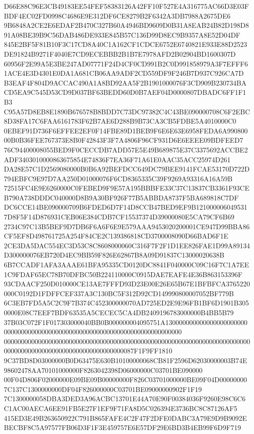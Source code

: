 \documentclass[UTF8,fontset=fandol,zihao=-4,a4paper]{ctexart}
\begin{document}
{{D66E88C96E3CB49183EE54FEF58383126A42FF10F527E4A316775AC66D3E03FBDF4EC02FD0998C4686E9E312DF6CE8279B2F6342A3DB7988A2675DE6
9B6848A2CE2E6EDAF2B470C327B60A4946BD9609D0B31A8EAB24B82D198D891A08BE39B9C56DAB486DE933E845B57C136D99D8EC9B9357A8E52D04DF
845E2BF5F81B10F3C17CD8A40C1A162CF1CDCE6752E6740821E933E88D2523DE91824B9271F4040E7CD9ECEBBB2B1B7E7978AFD2B02904BD1600307D
60956F2E99A5E3BE247AD07771F24D4CF0CD991B2C0D991858979A3F7EFFF61ACE4E3D4301E0DA1A681CB06AA9ADF2CD559DF9F246B7D937C926CA7D
B3EAF4F804D9ACCAC490A1A8BD92AA5F2B1901000076F3CD909B230734BACD5EA9C545D53CD9D037BF63BEDD60D0B7AEF04D0000807DBADC6FF1F1B3
C95A57D8EB8E1890B676578B8BDD7C73DC97382C4C43BE090000708C6F2EBC8D38FA17C6FAA6161783F62B7AE6D288B9B73CA3CB5FDBE5A4010000C0
0EBEF91D736F6EFFEE2EF0F14FBE89D1BEB9F6E6E63E6958FEDA6A99080000B0B36FEE767373E8B0F42843F3F7A4806F96CF931D6E6EEEE09BDFEED7
76C94400008055BED9F0CECCDB7ADD57E5E49B689875E37C3375692ACCBE2ADF3403010000863675854E74836F7EA36F71A61E0AAC35ACC25974D261
DA28E57C1D2569080000B0B6A92BEFDCC649DC79BEE9141FCAE53170D722D794EBFC9E97D7AA250D01000076F6CD8365335C39F9269A93316A16A59B
72515FC4E9E6260000C0FEBED9F9E57A195BBBFE33C37C13837CB3361F93CEB790A738DDDC040000D8B9A30BF926F77B5ABBDA8737F5BA689818C7DF
DC6CCE14BE090000709B6FDED6D7F14D8CCB47BED9EF9B1210000060495317D8F5F14D876931CEB06E384CDB7CF15537374D39000080E5CA79CF6B69
2734C97C13B5BEF9D7DB6F6A6F6E9E579AAA9453020200001CE947D99BBA86CF5EF8D498761725A254F84CE2C139386818CD3700008090D66BAD6F1E
2CE3DA5DAC554EC3D53C8C8608000060C316F7F2F1D1EE826FAE1D99A89134D300000076EB720D4EC9BB59F826E62867B8A09D91837C13000020638B
6B7CCADF1AFA3AAAE61BFA95335CD0120DC8841F040000C09C16F7C1A7EE1C9FDAF65EC78B70DFBC50B224110000C0915DAE7EAFE4E36B863153396F
93CDAACF250D010000CE13AE7FFFD93D23E00E26E65B67E1BFBFCA3765220000C0192D1FDFFCEF337A3C130BC5F312D92CD149990800007052BF779B
6C3EB7FD5A5C2C9F7B374C452300000070AD725ED2E9E96FB1BF6D1901B3050000E08C7EEF7BDF63535A5CECEC5CA4DB2409196783000000B4BB5B79
37B03C072F1F017303000040BB0B000000004095751A1300000000000000000000000000000000000000000000000000000000000000000000000000
00000000000000000000000000000000000000000000000000000000000000000000000000000000000000000000000000000000000087F1F9FF1810
9C37BD8D03000000B0D63475E630B10100000068CB81F2596D62030000003B74E98602478AA70101000000F8263042398D06000000C03701BE090000
00F04D806F02000000E09BE09B00000000F826C03701000000BE09F04D000000007C137C1300000000DF04F826000000C03701BE09000000902F1F19
7C1300000058DBA3DED3A96ACBC13701E44A70E90F00384036F9260E98C6C6C1AC00AECA6EE91FB5E27F1EF9F71FA8D5C026394E3736BC8C87126AF5
415ED3E49B263650922C791B865FAFE4C2F47F2DFE0DABC3A79E9D9B9092EBECBF8C5A97577FB06D3F1F3E459757E6E57DF29E6BD3B4EB99F6D9F719
}}
\end{document}

